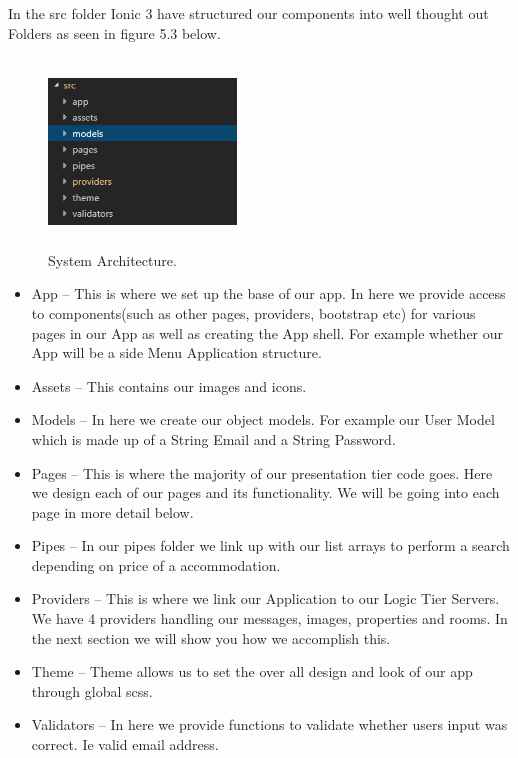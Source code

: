\noindent In the src folder Ionic 3 have structured our components into well thought out Folders as seen in figure 5.3 below.

\begin{figure}[h]
\centering
\includegraphics[width=5cm, height=5cm]{img/srcStructure}
\caption{System Architecture.}
\end{figure}

\begin{itemize}
\item App – This is where we set up the base of our app. In here we provide access to components(such as other pages, providers, bootstrap etc) for various pages in our App as well as creating the App shell. For example whether our App will be a side Menu Application structure.
\item Assets – This contains our images and icons. 
\item Models – In here we create our object models. For example our User Model which is made up of a String Email and a String Password.
\item Pages – This is where the majority of our presentation tier code goes. Here we design each of our pages and its functionality. We will be going into each page in more detail below.
\item Pipes – In our pipes folder we link up with our list arrays to perform a search depending on price of a accommodation.
\item Providers – This is where we link our Application to our Logic Tier Servers. We have 4 providers handling our messages, images, properties and rooms. In the next section we will show you how we accomplish this.
\item Theme – Theme allows us to set the over all design and look of our app through global scss.
\item Validators – In here we provide functions to validate whether users input was correct. Ie valid email address.
\end{itemize}

